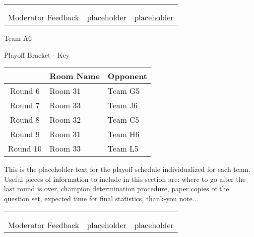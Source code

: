 \documentclass{article}%
\begin{document}
\newline%
%
\begin{tabularx}{\textwidth}{YYY}%
  &  &  \\%
\\%
Moderator Feedback&placeholder&placeholder\\%
\end{tabularx}%
\newpage%
\begin{center}%
\begin{Huge}%
Team A6%
\end{Huge}%
\vspace*{12pt}%
\linebreak%
\begin{Large}%
Playoff Bracket {-} Key%
\end{Large}%
\end{center}%
\vspace*{4pt}%
%
\begin{tabularx}{\textwidth}{|c|Y|Y|}%
\hline%
&Room Name&Opponent\\%
\hline%
Round 6&Room 31&Team G5\\%
Round 7&Room 33&Team J6\\%
Round 8&Room 32&Team C5\\%
Round 9&Room 31&Team H6\\%
Round 10&Room 33&Team L5\\%
\hline%
\end{tabularx}%
\vspace*{30pt}%
\linebreak%
This is the placeholder text for the playoff schedule individualized for each team. Useful pieces of information to include in this section are: where to go after the last round is over, champion determination procedure, paper copies of the question set, expected time for final statistics, thank{-}you note...%
\vspace*{30pt}%
\newline%
%
\begin{tabularx}{\textwidth}{YYY}%
  &  &  \\%
\\%
Moderator Feedback&placeholder&placeholder\\%
\end{tabularx}%
\end{document}
